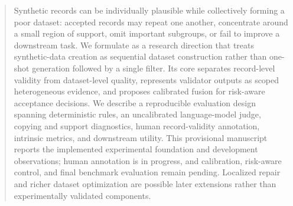 \begin{abstract}
Synthetic records can be individually plausible while collectively forming a
poor dataset: accepted records may repeat one another, concentrate around a
small region of support, omit important subgroups, or fail to improve a
downstream task. We formulate \rcqasyn{} as a research direction that treats
synthetic-data creation as sequential dataset construction rather than
one-shot generation followed by a single filter. Its core separates
record-level validity from dataset-level quality, represents validator outputs
as scoped heterogeneous evidence, and proposes calibrated fusion for
risk-aware acceptance decisions. We describe a reproducible evaluation design
spanning deterministic rules, an uncalibrated language-model judge, copying
and support diagnostics, human record-validity annotation, intrinsic metrics,
and downstream utility. This provisional manuscript reports the implemented
experimental foundation and development observations; human annotation is in
progress, and calibration, risk-aware control, and final benchmark evaluation
remain pending. Localized repair and richer dataset optimization are possible
later extensions rather than experimentally validated components.
\end{abstract}
